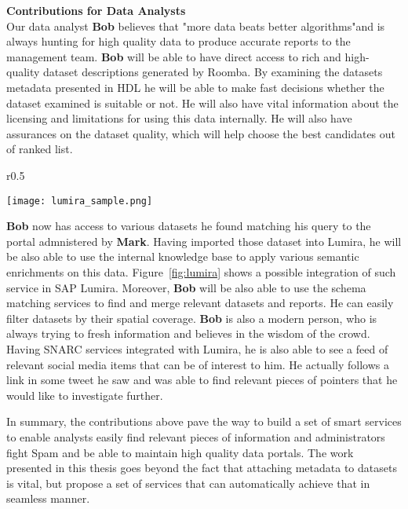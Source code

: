 \textbf{Contributions for Data Analysts}
\vspace{1mm}\\

Our data analyst \textbf{Bob} believes that "more data beats better algorithms"and is always hunting for high quality data to produce accurate reports to the management team. \textbf{Bob} will be able to have direct access to rich and high-quality dataset descriptions generated by Roomba. By examining the datasets metadata presented in HDL he will be able to make fast decisions whether the dataset examined is suitable or not. He will also have vital information about the licensing and limitations for using this data internally. He will also have assurances on the dataset quality, which will help choose the best candidates out of ranked list.
\begin{wrapfigure}{r}{0.5\textwidth}
  \begin{center}
    \texttt{[image: lumira\_sample.png]}
  \end{center}
  \caption{UI Prototype of semantic data enrichment in SAP Lumira}
  \label{fig:lumira}
\end{wrapfigure}
\textbf{Bob} now has access to various datasets he found matching his query to the portal admnistered by \textbf{Mark}. Having imported those dataset into Lumira, he will be also able to use the internal knowledge base to apply various semantic enrichments on this data. Figure~\ref{fig:lumira} shows a possible integration of such service in SAP Lumira. Moreover, \textbf{Bob} will be also able to use the schema matching services to find and merge relevant datasets and reports. He can easily filter datasets by their spatial coverage. \textbf{Bob} is also a modern person, who is always trying to fresh information and believes in the wisdom of the crowd. Having SNARC services integrated with Lumira, he is also able to see a feed of relevant social media items that can be of interest to him. He actually follows a link in some tweet he saw and was able to find relevant pieces of pointers that he would like to investigate further.


In summary, the contributions above pave the way to build a set of smart services to enable analysts easily find relevant pieces of information and administrators fight Spam and be able to maintain high quality data portals. The work presented in this thesis goes beyond the fact that attaching metadata to datasets is vital, but propose a set of services that can automatically achieve that in seamless manner.

